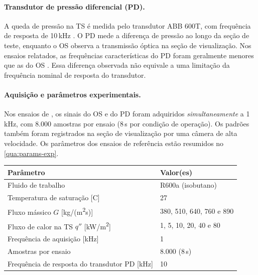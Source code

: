\paragraph{Transdutor de pressão diferencial (PD).}
A queda de pressão na TS é medida pelo transdutor ABB\texttrademark{} 600T, com frequência
de resposta de 10\,kHz \cite{deoliveira2021}. O PD mede a diferença de pressão ao
longo da seção de teste, enquanto o OS observa a transmissão óptica na seção de
visualização. Nos ensaios relatados, as frequências características do PD foram
geralmente menores que as do OS \cite{deoliveira2021}. Essa diferença observada
não equivale a uma limitação da frequência nominal de resposta do transdutor.

\paragraph{Aquisição e parâmetros experimentais.}
Nos ensaios de , os sinais do OS e do PD foram adquiridos
\textit{simultaneamente} a 1\,kHz, com 8.000 amostras por ensaio (8\,s por condição de operação).
Os padrões também foram registrados na seção de visualização por uma câmera de alta velocidade.
Os parâmetros dos
ensaios de referência estão resumidos no \autoref{qua:params-exp}.

\begin{quadro}[!htbp]
  \centering
  \begin{threeparttable}
  \caption{Parâmetros experimentais dos ensaios de .}
  \label{qua:params-exp}
  \begin{tabular}{ll}
    \hline
    \textbf{Parâmetro}                                        & \textbf{Valor(es)}           \\
    \hline
    Fluido de trabalho                                        & R600a (isobutano)            \\
    Temperatura de saturação [\textdegree{}C]                 & 27                           \\
    Fluxo mássico $G$ [kg/(m\textsuperscript{2}s)]           & 380, 510, 640, 760 e 890     \\
    Fluxo de calor na TS $q''$ [kW/m\textsuperscript{2}]     & 1, 5, 10, 20, 40 e 80        \\
    Frequência de aquisição [kHz]                             & 1                            \\
    Amostras por ensaio                                       & 8.000 (8\,s)                 \\
    Frequência de resposta do transdutor PD [kHz]            & 10                           \\
    \hline
  \end{tabular}
  \end{threeparttable}
\end{quadro}

